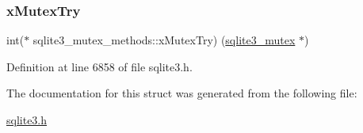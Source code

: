 \subsubsection{\texorpdfstring{x\+Mutex\+Try}{xMutexTry}}
{\footnotesize\ttfamily int($\ast$ sqlite3\+\_\+mutex\+\_\+methods\+::x\+Mutex\+Try) (\mbox{\hyperlink{sqlite3_8h_a0f546860bde03fddb33a9fed920da05c}{sqlite3\+\_\+mutex}} $\ast$)}



Definition at line 6858 of file sqlite3.\+h.



The documentation for this struct was generated from the following file\+:\begin{DoxyCompactItemize}
\item 
\mbox{\hyperlink{sqlite3_8h}{sqlite3.\+h}}\end{DoxyCompactItemize}
